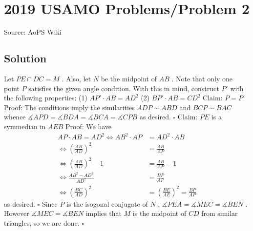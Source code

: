 \documentclass[12pt]{article}
\begin{document}
\section*{{2019 USAMO Problems/Problem 2}}
Source: AoPS Wiki

\subsection*{Solution}
Let $PE \cap DC = M$ . Also, let $N$ be the midpoint of $AB$ .
Note that only one point $P$ satisfies the given angle condition. With this in mind, construct $P'$ with the following properties: (1) $AP' \cdot AB = AD^2$ (2) $BP' \cdot AB = CD^2$ Claim: $P = P'$ Proof:
The conditions imply the similarities $ADP \sim ABD$ and $BCP \sim BAC$ whence $\measuredangle APD = \measuredangle BDA = \measuredangle BCA = \measuredangle CPB$ as desired. $\square$ Claim: $PE$ is a symmedian in $AEB$ Proof:
We have \begin{align*} AP \cdot AB = AD^2 \iff AB^2 \cdot AP &= AD^2 \cdot AB \\ \iff \left( \frac{AB}{AD} \right)^2 &= \frac{AB}{AP} \\ \iff \left( \frac{AB}{AD} \right)^2 - 1 &= \frac{AB}{AP} - 1 \\ \iff \frac{AB^2 - AD^2}{AD^2} &= \frac{BP}{AP} \\ \iff \left(\frac{BC}{AD} \right)^2 &= \left(\frac{BE}{AE} \right)^2 = \frac{BP}{AP} \end{align*} as desired. $\square$ Since $P$ is the isogonal conjugate of $N$ , $\measuredangle PEA = \measuredangle MEC = \measuredangle BEN$ . However $\measuredangle MEC = \measuredangle BEN$ implies that $M$ is the midpoint of $CD$ from similar triangles, so we are done. $\square$
\end{document}
